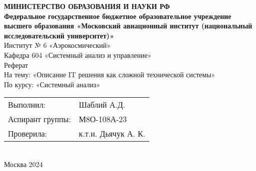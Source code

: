 \begin{center}
\textbf{МИНИСТЕРСТВО ОБРАЗОВАНИЯ И НАУКИ РФ}\\[4\baselineskip]
\textbf{Федеральное государственное бюджетное образовательное учреждение высшего образования «Московский авиационный институт (национальный исследовательский университет)»}\\[4\baselineskip]
Институт № 6 «Аэрокосмический» \\[1\baselineskip]
Кафедра 604 «Системный анализ и управление»\\[4\baselineskip]
Реферат\\[2\baselineskip]
На тему: «Описание IT решения как сложной технической системы»\\[1\baselineskip]
По курсу: «Системный анализ»\\[4\baselineskip]
\begin{tabularx}{\textwidth}{ >{\raggedright\arraybackslash}X >{\raggedleft\arraybackslash}X }
    
Выполнил: & Шаблий А.Д. \\
Аспирант группы: & М8О-108А-23 \\
Проверила: & к.т.н. Дьячук А. К. \\
    
\end{tabularx}\\[5\baselineskip]
Москва 2024

\end{center}
